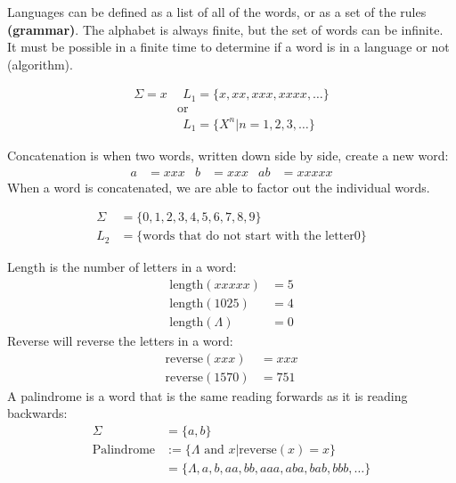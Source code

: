 Languages can be defined as a list of all of the words, or as a set of the rules \textbf{(grammar)}. The alphabet is always finite, but the set of words can be infinite. It must be possible in a finite time to determine if a word is in a language or not (algorithm).

\begin{align*}
    \Sigma={x} &\ \ L_1=\{x,xx,xxx,xxxx,\ldots\}\\
    &\text{or}\\
    &\ \ L_1 = \{X^n | n = 1,2,3,\ldots\}
\end{align*}

Concatenation is when two words, written down side by side, create a new word:
\begin{align*}
    a&=xxx & b&=xxx & ab&=xxxxx
\end{align*}
When a word is concatenated, we are able to factor out the individual words.

\begin{align*}
    \Sigma&=\{0,1,2,3,4,5,6,7,8,9\}\\
    L_2&=\{\text{words that do not start with the letter} 0\}
\end{align*}

Length is the number of letters in a word:
\begin{align*}
    \text{length}(xxxxx)&=5\\
    \text{length}(1025)&=4\\
    \text{length}(\Lambda)&=0
\end{align*}
Reverse will reverse the letters in a word:
\begin{align*}
    \text{reverse}(xxx)&=xxx\\
    \text{reverse}(1570)&=751
\end{align*}
A palindrome is a word that is the same reading forwards as it is reading backwards:
\begin{align*}
    \Sigma&=\{a,b\}\\
    \text{Palindrome}&:=\{\Lambda \text{ and } x | \text{reverse}(x) = x\}\\
    &=\{\Lambda, a, b, aa, bb, aaa, aba, bab, bbb, \ldots\}
\end{align*}


